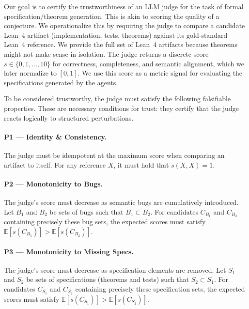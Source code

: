 \documentclass{article}
\begin{document}
Our goal is to certify the trustworthiness of an LLM judge for the task of formal specification/theorem generation.
This is akin to scoring the quality of a conjecture.
We operationalize this by requiring the judge to compare a candidate Lean~4 artifact (implementation, tests, theorems) against its gold-standard Lean~4 reference.
We provide the full set of Lean~4 artifacts because theorems might not make sense in isolation.
The judge returns a discrete score $s\in\{0,1,\dots,10\}$ for correctness, completeness, and semantic alignment, which we later normalize to $[0,1]$.
We use this score as a metric signal for evaluating the specifications generated by the agents.

To be considered trustworthy, the judge must satisfy the following falsifiable properties.
These are necessary conditions for trust: they certify that the judge reacts logically to structured perturbations.

\paragraph{P1 --- Identity \& Consistency.}
The judge must be idempotent at the maximum score when comparing an artifact to itself.
For any reference $X$, it must hold that $s(X,X)=1$.

\paragraph{P2 --- Monotonicity to Bugs.}
The judge's score must decrease as semantic bugs are cumulatively introduced. Let $B_1$ and $B_2$ be sets of bugs such that $B_1 \subset B_2$. For candidates $C_{B_1}$ and $C_{B_2}$ containing precisely these bug sets, the expected scores must satisfy $\mathbb{E}[s(C_{B_1})] > \mathbb{E}[s(C_{B_2})]$.

\paragraph{P3 --- Monotonicity to Missing Specs.}
The judge's score must decrease as specification elements are removed.
Let $S_1$ and $S_2$ be sets of specifications (theorems and tests) such that $S_2 \subset S_1$.
For candidates $C_{S_1}$ and $C_{S_2}$ containing precisely these specification sets, the expected scores must satisfy $\mathbb{E}[s(C_{S_1})] > \mathbb{E}[s(C_{S_2})]$.
\end{document}
